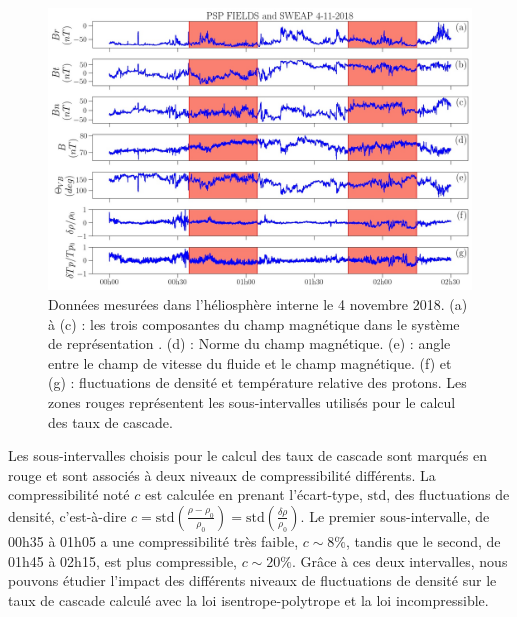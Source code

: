  \begin{figure}[!ht]
 \centering
 \includegraphics[width=\linewidth,trim=0cm 0cm 0cm 0cm, clip=false]{./Mainmatter/Part_1/images/Fig_04112018H_00_panel}
 \cprotect\caption{Données  mesurées dans l'héliosphère interne le 4 novembre 2018. (a) à (c) : les trois composantes du champ magnétique dans le système de représentation . (d) : Norme du champ magnétique. (e) : angle entre le champ de vitesse du fluide et le champ magnétique. (f) et (g) : fluctuations de densité et température relative des protons. Les zones rouges représentent les sous-intervalles utilisés pour le calcul des taux de cascade.}
 \label{fig:data_PSP}
 \end{figure}

Les sous-intervalles choisis pour le calcul des taux de cascade sont marqués en rouge et sont associés à deux niveaux de compressibilité différents. La compressibilité noté $c$ est calculée en prenant l'écart-type, $\text{std}$, des fluctuations de densité, c'est-à-dire $c = \text{std}(\frac{\rho - \rho_0}{\rho_0}) = \text{std}(\frac{\delta \rho}{\rho_0})$. Le premier sous-intervalle, de 00h35 à 01h05 a une compressibilité très faible, $c \sim 8\%$, tandis que le second, de 01h45 à 02h15, est plus compressible, $c \sim 20\%$. Grâce à ces deux intervalles, nous pouvons étudier l'impact des différents niveaux de fluctuations de densité sur le taux de cascade calculé avec la loi isentrope-polytrope et la loi incompressible.


